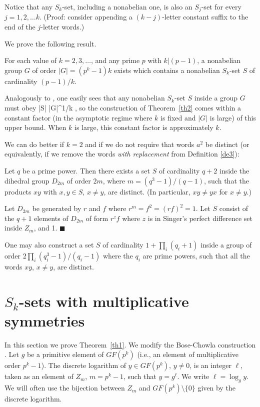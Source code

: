 Notice that any $S_k$-set, including a nonabelian one, is
also an $S_j$-set for every $j = 1 , 2 , \dots k$.
(Proof: consider appending a $(k-j)$-letter constant suffix to the end of
the $j$-letter words.)

We prove the following result.

\begin{theo}
\label{th2}
For each value of $k = 2 , 3, \dots$, and any prime $p$ with
$k | (p-1)$,
a nonabelian group $G$ of order $|G|= (p^k - 1) k$
exists which contains a nonabelian $S_k$-set $S$ of cardinality 
$(p-1)/k$.
\end{theo}

Analogously to , one easily sees that any nonabelian
$S_k$-set $S$
inside a group $G$ must obey
|S| \le |G|^{1/k} ,
\eeq
so the construction of Theorem~\ref{th2} comes within a
constant factor (in the asymptotic regime where $k$ is fixed
and $|G|$ is large) of this upper bound. When $k$ is large,
this constant factor
is approximately $k$.

We can do better if $k=2$ and if we do not require
that words $a^2$ be distinct (or equivalently, if we remove the words
{\em with replacement} from Definition \ref{de3}):
\begin{theo}
\label{th3}
Let $q$ be a prime power.
Then there exists
a set $S$ of
cardinality $q+2$ inside
the dihedral group $D_{2m}$ of  order $2m$,
where $m = ( q^3-1 ) / ( q-1 )$,
such that the products $xy$ with $x,y \in S$, $x \neq y$, are distinct.
(In particular, $xy \neq yx$ for $x \neq y$.)
\end{theo}

Let $D_{2m}$ be generated by $r$ and $f$ where
$r^m = f^2 = ( r f )^2 = 1$.
Let $S$ consist of
the $q+1$ elements of $D_{2m}$ of form $r^z f$ where $z$ is
in Singer's perfect difference set inside $Z_m$, and 1. \hfill $\blacksquare$

\vsp
{}
One may also construct
a set $S$
of cardinality $1 + \prod_i (q_i+1)$ inside
a group of order $2 \prod_i ( q_i^3-1 ) / ( q_i-1 )$
where the $q_i$ are prime powers,
such that all the words $xy$, $x \neq y$, are distinct.
\section{$S_k$-sets with multiplicative symmetries}
\hsp
In this section we prove Theorem~\ref{th1}.
We modify the Bose-Chowla construction \cite{Bose62,Halb66}.
Let $g$ be a primitive element of $GF(p^k)$ (i.e., an element of multiplicative
order $p^k -1$).
The discrete logarithm of $y \in GF(p^k)$, $y \neq 0$, is an integer
$\ell$,
taken as an element of $Z_m$, $m= p^k -1$, such that $y=g^\ell$.
We write $\ell = \log_g y$.
We will often use the bijection between $Z_m$ and $GF(p^k) \setminus \{0\}$ given by the discrete
logarithm.

